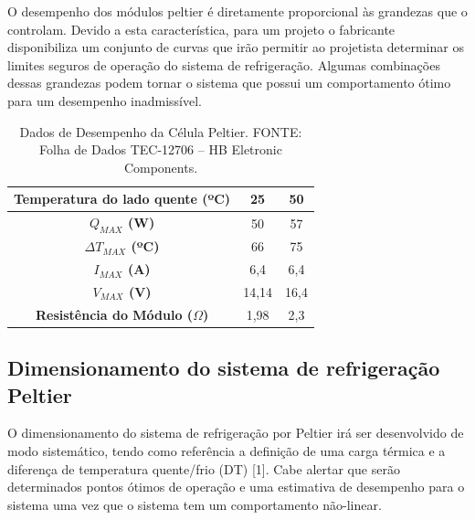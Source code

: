 O desempenho dos módulos peltier é diretamente proporcional às grandezas que o controlam. Devido a esta característica, para um projeto o fabricante disponibiliza um conjunto de curvas que irão permitir ao projetista determinar os limites seguros de operação do sistema de refrigeração. Algumas combinações dessas grandezas podem tornar o sistema que possui um comportamento ótimo para um desempenho inadmissível. 

\begin{table}[H]
\begin{center}
\caption{Dados de Desempenho da Célula Peltier. FONTE: Folha de Dados TEC-12706 – HB Eletronic Components.}
\begin{tabular}{|c|c|c|}
\hline
\textbf{Temperatura do lado quente (ºC)} & 25 & 50  \\
\hline
\textbf{$Q_{MAX}$ (W)} & 50 & 57 \\
\hline
\textbf{$\Delta T_{MAX}$ (ºC)}& 66 & 75 \\
\hline
\textbf{$I_{MAX}$ (A)} & 6,4 & 6,4 \\
\hline
\textbf{$V_{MAX}$ (V)} & 14,14 & 16,4 \\
\hline 
\textbf{Resistência do Módulo ($\Omega$)} & 1,98 & 2,3\\
\hline
\end{tabular}

\end{center}
\end{table}
\subsection{Dimensionamento do sistema de refrigeração Peltier}
O dimensionamento do sistema de refrigeração por Peltier irá ser desenvolvido de modo sistemático, tendo como referência a definição de uma carga térmica e a diferença de temperatura quente/frio (DT) [1]. Cabe alertar que serão determinados pontos ótimos de operação e uma estimativa de desempenho para o sistema uma vez que o sistema tem um comportamento não-linear. 


